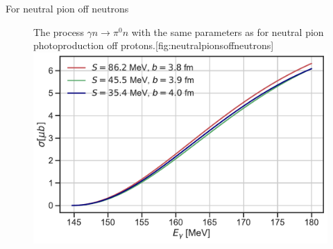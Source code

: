 For neutral pion off neutrons
\begin{figure}[H]
    \begin{sidecaption}{The process $\gamma n \rightarrow \pi^0 n$ with the same parameters as for neutral pion photoproduction off protons.}[fig:neutralpionsoffneutrons]
    \includegraphics[width=\linewidth]{Figures/NeutralPionsOffNeutrons.pdf}
    \end{sidecaption}
\end{figure}


